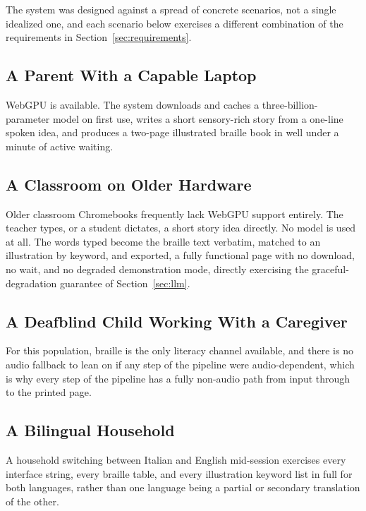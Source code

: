 \documentclass[conference]{IEEEtran}
\begin{document}
The system was designed against a spread of concrete scenarios, not a single idealized one, and each scenario below exercises a different combination of the requirements in Section~\ref{sec:requirements}.

\subsection{A Parent With a Capable Laptop}

WebGPU is available. The system downloads and caches a three-billion-parameter model on first use, writes a short sensory-rich story from a one-line spoken idea, and produces a two-page illustrated braille book in well under a minute of active waiting.

\subsection{A Classroom on Older Hardware}

Older classroom Chromebooks frequently lack WebGPU support entirely. The teacher types, or a student dictates, a short story idea directly. No model is used at all. The words typed become the braille text verbatim, matched to an illustration by keyword, and exported, a fully functional page with no download, no wait, and no degraded demonstration mode, directly exercising the graceful-degradation guarantee of Section~\ref{sec:llm}.

\subsection{A Deafblind Child Working With a Caregiver}

For this population, braille is the only literacy channel available, and there is no audio fallback to lean on if any step of the pipeline were audio-dependent, which is why every step of the pipeline has a fully non-audio path from input through to the printed page.

\subsection{A Bilingual Household}

A household switching between Italian and English mid-session exercises every interface string, every braille table, and every illustration keyword list in full for both languages, rather than one language being a partial or secondary translation of the other.
\end{document}
